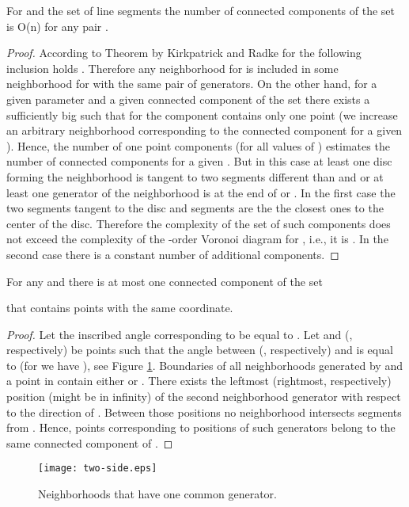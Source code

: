 \documentclass[11pt]{llncs}
\begin{document}
\begin{lemma}
\label{components}
For  and the set  of  line segments the number of connected components 
of the set 
is O(n) for any pair .
\end{lemma}
\begin{proof}
 According to Theorem by Kirkpatrick and Radke \cite{kr85} for  
the following inclusion holds .
Therefore any neighborhood for  is included in some neighborhood for  with 
the same pair of generators.
On the other hand, for a given parameter  and a given connected component 
of the set 
there exists a sufficiently big  such that for  the component contains only one point
(we increase an arbitrary neighborhood corresponding to the connected component for 
a given ).
Hence, the number of one point components (for all values of ) estimates
the number of connected components for a given .
But in this case at least one disc forming the neighborhood is tangent to two
segments different than  and  or at least one generator of the neighborhood
is at the end of  or .
In the first case the two segments tangent to the disc and segments  are the
the closest ones to the center of the disc. Therefore the complexity
of the set of such components does not exceed the complexity of the -order
Voronoi diagram for , i.e., it is  \cite{pz13}.
In the second case there is a constant number of additional components.   

\end{proof}


\begin{lemma}
\label{two-side}
For any  and  there is at most one connected component of the set

that contains points with the same  coordinate. 
\end{lemma}
\begin{proof}
 Let the inscribed angle corresponding to  be equal to .
Let  and  (, respectively) be points 
such that the angle between  (, respectively) and  is equal to 
(for  we have ), see Figure \ref{fig:two-side}.
 Boundaries of all neighborhoods  
generated by  and a point in  contain either  or . 
There exists the leftmost (rightmost, respectively) position (might be in infinity) 
of the second neighborhood generator with respect to the direction of . Between 
those positions no neighborhood intersects segments from . 
 Hence, points corresponding to positions of such generators 
belong to the same connected component of 
. 
\end{proof}


\begin{figure}[htbp]
\centering
\texttt{[image: two-side.eps]}
\caption{Neighborhoods that have one common generator.}
\label{fig:two-side}
\end{figure}
\end{document}
